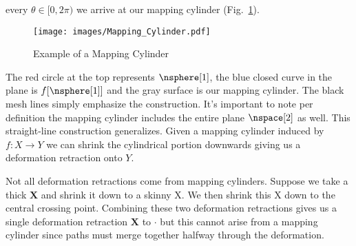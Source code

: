 \documentclass{book}                                                           %
\begin{document}
                every $\theta\in[0,2\pi)$ we arrive at our mapping cylinder
                (Fig.~\ref{fig:Ex_Mapping_Cylinder}).
                \begin{figure}[H]
                    \centering
                    \captionsetup{type=figure}
                    \texttt{[image: images/Mapping\_Cylinder.pdf]}
                    \caption{Example of a Mapping Cylinder}
                    \label{fig:Ex_Mapping_Cylinder}
                \end{figure}
                The red circle at the top represents $\nsphere[1]$, the blue
                closed curve in the plane is $f[\nsphere[1]]$ and the gray
                surface is our mapping cylinder. The black mesh lines simply
                emphasize the construction. It's important to note per
                definition the mapping cylinder includes the entire plane
                $\nspace[2]$ as well. This straight-line construction
                generalizes. Given a mapping cylinder induced by
                $f:X\rightarrow{Y}$ we can shrink the cylindrical portion
                downwards giving us a deformation retraction onto $Y$.
                \par\hfill\par
                Not all deformation retractions come from mapping cylinders.
                Suppose we take a thick $\textbf{X}$ and shrink it down to a
                skinny X. We then shrink this X down to the central crossing
                point. Combining these two deformation retractions gives us a
                single deformation retraction $\textbf{X}$ to $\cdot$ but this
                cannot arise from a mapping cylinder since paths must merge
                together halfway through the deformation.
\end{document}
